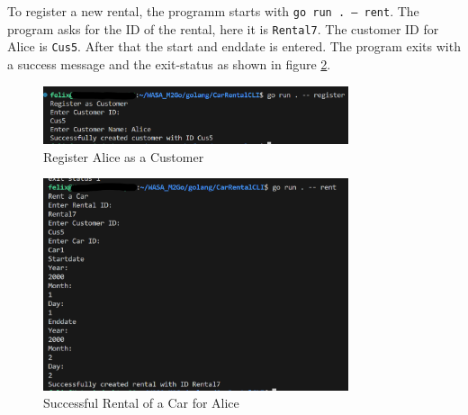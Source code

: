 To register a new rental, the programm starts with \texttt{go run . -- rent}.
The program asks for the ID of the rental, here it is \texttt{Rental7}.
The customer ID for Alice is \texttt{Cus5}.
After that the start and enddate is entered.
The program exits with a success message and the exit-status as shown in figure \ref{fig:car_rental_cli_rental_alice_successful}.

\begin{figure}
      \centering
      \includegraphics[width=0.8\textwidth]{figures/goLang/carRental/carRentalCLI/carRentalCLI_RegisterAlice.png}
      \caption{Register Alice as a Customer}
      \label{fig:car_rental_cli_register_alice}
\end{figure}
\begin{figure}
      \centering
      \includegraphics[width=0.8\textwidth]{figures/goLang/carRental/carRentalCLI/carRentalCLI_SuccessfulRentalAlice.png}
      \caption{Successful Rental of a Car for Alice}
      \label{fig:car_rental_cli_rental_alice_successful}
\end{figure}
